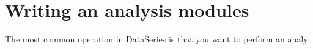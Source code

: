 \chapter{Writing an analysis modules}\label{chap:analysis-module}

The most common operation in DataSeries is that you want to perform an analy
